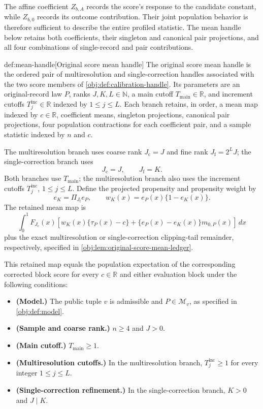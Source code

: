 \documentclass[11pt]{article}
\begin{document}
The affine coefficient \(Z_{b,A}\) records the score's response to the candidate constant, while \(Z_{b,0}\) records its outcome contribution. Their joint population behavior is therefore sufficient to describe the entire profiled statistic. The mean handle below retains both coefficients, their singleton and canonical pair projections, and all four combinations of single-record and pair contributions.

\begin{algorithmv}{def:mean-handle}[Original score mean handle]
The original score mean handle is the ordered pair of multiresolution and single-correction handles associated with the two score members of \cref{obj:def:calibration-handle}. Its parameters are an original-record law \(P\), ranks \(J,K,L\in\mathbb N\), a main cutoff \(T_{\mathrm{main}}\in\mathbb R\), and increment cutoffs \(T_j^{\mathrm{inc}}\in\mathbb R\) indexed by \(1\le j\le L\). Each branch retains, in order, a mean map indexed by \(c\in\mathbb R\), coefficient means, singleton projections, canonical pair projections, four population contractions for each coefficient pair, and a sample statistic indexed by \(n\) and \(c\).

The multiresolution branch uses coarse rank \(J_{\mathrm c}=J\) and fine rank \(J_{\mathrm f}=2^LJ\); the single-correction branch uses
\[
J_{\mathrm c}=J,\qquad J_{\mathrm f}=K.
\]
Both branches use \(T_{\mathrm{main}}\); the multiresolution branch also uses the increment cutoffs \(T_j^{\mathrm{inc}}\), \(1\le j\le L\). Define the projected propensity and propensity weight by
\[
e_K=\Pi_{J_{\mathrm f}}e_P,
\qquad
w_K(x)=e_P(x)\{1-e_K(x)\}.
\]
The retained mean map is
\[
\int_0^1 F_{J_{\mathrm c}}(x)
\left[
w_K(x)\{\tau_P(x)-c\}
+\{e_P(x)-e_K(x)\}m_{0,P}(x)
\right]\,dx
\]
plus the exact multiresolution or single-correction clipping-tail remainder, respectively, specified in \cref{obj:lem:original-score-mean-ledger}.

This retained map equals the population expectation of the corresponding corrected block score for every \(c\in\mathbb R\) and either evaluation block under the following conditions:
\begin{itemize}
\item \textbf{(Model.)} The public tuple \(v\) is admissible and \(P\in\mathcal M_v\), as specified in \cref{obj:def:model}.
\item \textbf{(Sample and coarse rank.)} \(n\ge4\) and \(J>0\).
\item \textbf{(Main cutoff.)} \(T_{\mathrm{main}}\ge1\).
\item \textbf{(Multiresolution cutoffs.)} In the multiresolution branch, \(T_j^{\mathrm{inc}}\ge1\) for every integer \(1\le j\le L\).
\item \textbf{(Single-correction refinement.)} In the single-correction branch, \(K>0\) and \(J\mid K\).
\end{itemize}


\end{algorithmv}
\end{document}
